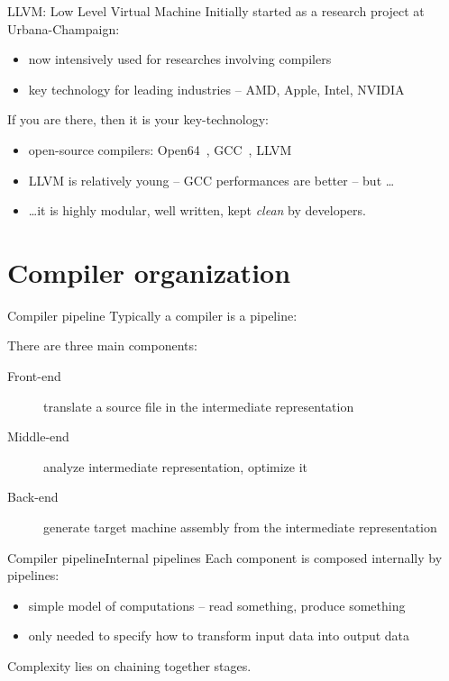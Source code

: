 \documentclass[10pt,mathserif]{beamer}
\begin{document}
\begin{frame}{LLVM: Low Level Virtual Machine}
	Initially started as a research project at Urbana-Champaign:
	
	\begin{itemize}
		\item now intensively used for \alert{researches} involving compilers
		\item key technology for \alert{leading industries} -- AMD, Apple, Intel,
		NVIDIA
	\end{itemize}
	
	\vfill
	If you are there, then it is \alert{your key-technology}:
	
	\begin{itemize}
		\item open-source compilers: Open64~\cite{LOCAL:www/open64},
		GCC~\cite{LOCAL:www/gcc}, LLVM~\cite{LOCAL:www/llvm}
		\item LLVM is relatively \alert{young} -- GCC performances are  better -- but \ldots
		\item \ldots it is highly modular, well written, kept \emph{clean} by developers.
	\end{itemize}
\end{frame}

\section{Compiler organization}
\begin{frame}{Compiler pipeline}
	Typically a compiler is a \alert{pipeline}:
	
	\begin{figure}
		\centering
		
	\end{figure}
	
	\vfill
	There are three main components:
	\begin{description}
		\item[Front-end] \alert{translate} a source file in the \alert{intermediate representation}
		\item[Middle-end] \alert{analyze} intermediate representation, \alert{optimize}
		it
		\item[Back-end] \alert{generate} target machine assembly from the intermediate
		representation
	\end{description}
\end{frame}

\begin{frame}{Compiler pipeline}{Internal pipelines}
	Each component is composed internally by pipelines:
	
	\begin{itemize}
		\item simple model of computations -- \alert{read} something, \alert{produce}
		something
		\item only needed to specify \alert{how to transform} input data into output
		data
	\end{itemize}
	
	Complexity lies on \alert{chaining} together stages.
\end{frame}
\end{document}
